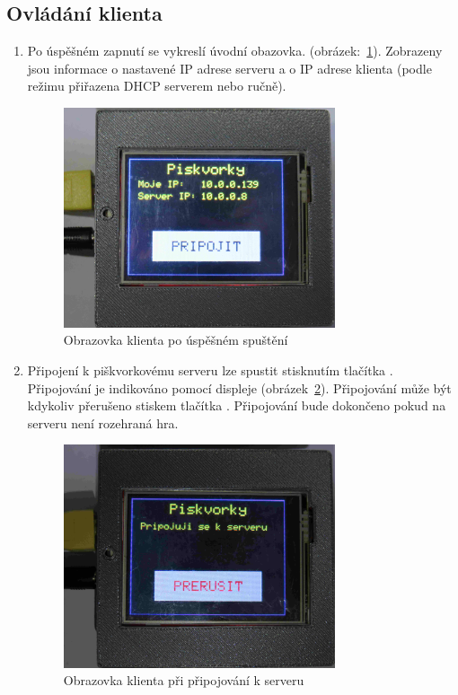 \subsection{Ovládání klienta}
\begin{enumerate}
\item Po úspěšném zapnutí se vykreslí úvodní obazovka. (obrázek:~\ref{fig:faze1}).  Zobrazeny jsou informace o nastavené IP adrese serveru a o IP adrese klienta (podle režimu přiřazena DHCP serverem nebo ručně).
\begin{figure}[H]
\centering
\includegraphics[width=8cm]{img/gameFlow/phase01.jpg}
\caption{\label{fig:faze1} Obrazovka klienta po úspěšném spuštění}
\end{figure}

\item Připojení k piškvorkovému serveru lze spustit stisknutím tlačítka . Připojování je indikováno pomocí displeje (obrázek~\ref{fig:faze2}). Připojování může být kdykoliv přerušeno stiskem tlačítka . Připojování bude dokončeno pokud na serveru není rozehraná hra.
\begin{figure}[H]
\centering
\includegraphics[width=8cm]{img/gameFlow/phase02.jpg}
\caption{\label{fig:faze2} Obrazovka klienta při připojování k serveru}
\end{figure}


\end{enumerate}

